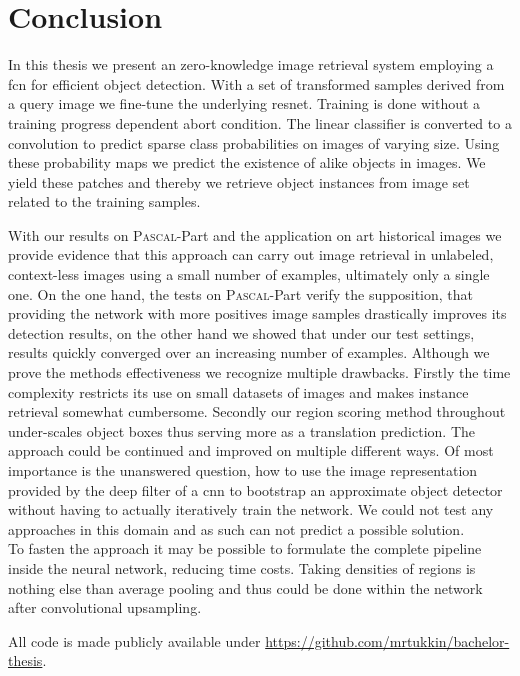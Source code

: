 %
\chapter{Conclusion}
\label{sec:conclusion}
In this thesis we present an zero-knowledge image retrieval system employing a \acrlong{fcn} for efficient object detection. With a set of transformed samples derived from a query image we fine-tune the underlying \gls{resnet}. Training is done without a training progress dependent abort condition. The linear classifier is converted to a convolution to predict sparse class probabilities on images of varying size. Using these probability maps we predict the existence of alike objects in images. We yield these patches and thereby we retrieve object instances from image set related to the training samples.

With our results on \textsc{Pascal}-Part and the application on art historical images we provide evidence that this approach can carry out image retrieval in unlabeled, context-less images using a small number of examples, ultimately only a single one. On the one hand, the tests on \textsc{Pascal}-Part verify the supposition, that providing the network with more positives image samples drastically improves its detection results, on the other hand we showed that under our test settings, results quickly converged over an increasing number of examples.
Although we prove the methods effectiveness we recognize multiple drawbacks. Firstly the time complexity  restricts its use on small datasets of images and makes instance retrieval somewhat cumbersome. Secondly our region scoring method throughout under-scales object boxes thus serving more as a translation prediction.
The approach could be continued and improved on multiple different ways. Of most importance is the unanswered question, how to use the image representation provided by the deep filter of a \gls{cnn} to bootstrap an approximate object detector without having to actually iteratively train the network. We could not test any approaches in this domain and as such can not predict a possible solution.\\
To fasten the approach it may be possible to formulate the complete pipeline inside the neural network, reducing time costs. Taking densities of regions is nothing else than average pooling and thus could be done within the network after convolutional upsampling.

All code is made publicly available under \url{https://github.com/mrtukkin/bachelor-thesis}.
